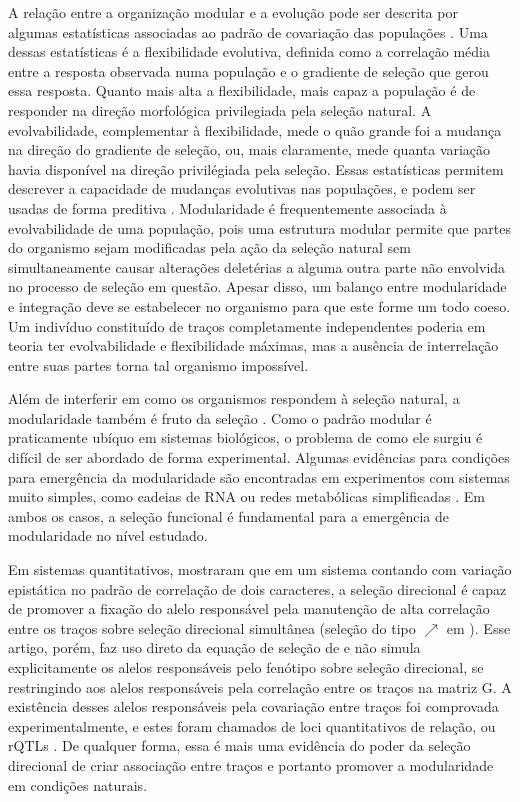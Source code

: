 A relação entre a organização modular e a evolução pode ser descrita por
algumas estatísticas associadas ao padrão de covariação das populações
\citep{Hansen2008}. 
Uma dessas estatísticas é a flexibilidade evolutiva, definida como a
correlação média entre a resposta observada numa população e o gradiente
de seleção que gerou essa resposta. 
Quanto mais alta a flexibilidade, mais capaz a população é de responder
na direção morfológica privilegiada pela seleção natural. 
A evolvabilidade, complementar à flexibilidade, mede o quão grande foi a
mudança na direção do gradiente de seleção, ou, mais claramente, mede
quanta variação havia disponível na direção privilégiada pela seleção. 
Essas estatísticas permitem descrever a capacidade de mudanças evolutivas
nas populações, e podem ser usadas de forma preditiva
\citep[veja, por exemplo,][]{Marroig2010}. 
Modularidade é frequentemente associada à evolvabilidade de uma
população, pois uma estrutura modular permite que partes do organismo sejam
modificadas pela ação da seleção natural sem simultaneamente causar
alterações deletérias a alguma outra parte não envolvida no processo de
seleção em questão. 
Apesar disso, um balanço entre modularidade e integração deve se
estabelecer no organismo para que este forme um todo coeso. 
Um indivíduo constituído de traços completamente independentes poderia
em teoria ter evolvabilidade e flexibilidade máximas, mas a ausência de
interrelação entre suas partes torna tal organismo impossível. 

Além de interferir em como os organismos respondem à seleção natural, a
modularidade também é fruto da seleção \citep{Wagner1996, Wagner2007}. 
Como o padrão modular é praticamente ubíquo em sistemas biológicos, o
problema de como ele surgiu é difícil de ser abordado de forma
experimental. 
Algumas evidências para condições para emergência da modularidade são
encontradas em experimentos com sistemas muito simples, como cadeias de
RNA \citep{Ancel2000} ou redes metabólicas simplificadas
\citep{Espinosa-Soto2010}. 
Em ambos os casos, a seleção funcional é fundamental para a emergência
de modularidade no nível estudado.

Em sistemas quantitativos, \cite{Pavlicev2010} mostraram que em um
sistema contando com variação epistática no padrão de correlação de dois
caracteres, a seleção direcional é capaz de promover a fixação do alelo
responsável pela manutenção de alta correlação entre os traços sobre
seleção direcional simultânea  (seleção do tipo $\nearrow$ em
\cite{Jones2004}). 
Esse artigo, porém, faz uso direto da equação de seleção de
\cite{Lande1979} e não simula explicitamente os alelos responsáveis pelo
fenótipo sobre seleção direcional, se restringindo aos alelos
responsáveis pela correlação entre os traços na matriz G. 
A existência desses alelos responsáveis pela covariação entre traços foi
comprovada experimentalmente, e estes foram chamados de loci
quantitativos de relação, ou rQTLs \citep{Pavlicev2008a}. 
De qualquer forma, essa é mais uma evidência do poder da seleção
direcional de criar associação entre traços e portanto promover a
modularidade em condições naturais. 


